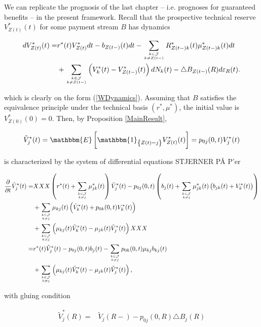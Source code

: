\documentclass{book}
\newcommand{\1}[1]{\mathbbm{1}_{\left\lbrace #1 \right\rbrace}}
\newcommand{\expec}[1][def]{\mathbbm{E} \left[ #1 \right]}
\theoremstyle{break}
\theoremstyle{remark}
\newenvironment{remark}
  {\pushQED{\qed}\renewcommand{\qedsymbol}{\scalebox{1.4}{$\circ$}}\remarkx}
  {\popQED\endremarkx}
\numberwithin{equation}{section}
\begin{document}
\begin{remark}
	We can replicate the prognosis of the last chapter -- i.e. prognoses for guaranteed benefits -- in the present framework. Recall that the prospective technical reserve $V_{Z(t)}^*(t)$ for some payment stream $B$ has dynamics
	
	\begin{align*}
			dV_{Z(t)}^*(t) =& r^*(t) V_{Z(t)}^* dt - b_{Z(t-)}(t) dt - \sum_{k \in \mathcal{J} \atop k \neq Z(t-)} R_{Z(t-)k}^*(t) \mu_{Z(t-)k}^*(t) dt \\
			&+ \sum_{k \in \mathcal{J} \atop k \neq Z(t-)} \left( V_k^*(t) - V_{Z(t-)}^*(t) \right) dN_k(t) - \triangle B_{Z(t-)}(R) d\varepsilon_{R}(t).
	\end{align*}

	which is clearly on the form (\ref{WDynamics}). Assuming that $B$ satisfies the equivalence principle under the technical basis $(r^*,\mu^*)$, the initial value is $V_{Z(0)}^*(0)=0$. Then, by Proposition \ref{MainResult},
	
	\begin{align*}
	\tilde{V}_j^*(t) = \expec[\1{Z(t)=j} V_{Z(t)}^*(t)] = p_{0j}(0,t) V_j^*(t)
	\end{align*}

	is characterized by the system of differential equations STJERNER PÅ P'er
	
	\begin{align*}
		\frac{\partial}{\partial t} \tilde{V}_j^*(t) =& XXX\left( r^*(t) + \sum_{k \in \mathcal{J} \atop k \neq j} \mu_{jk}^*(t) \right) \tilde{V}_j^*(t) - p_{0j}(0,t) \left( b_j(t) + \sum_{k \in \mathcal{J} \atop k \neq j} \mu_{jk}^*(t) \left( b_{jk}(t) + V_k^*(t) \right) \right) \\
		&+ \sum_{k \in \mathcal{J} \atop k \neq j} \mu_{kj}(t) \left( \tilde{V}_k^*(t) + p_{0k}(0,t) V_k^*(t) \right) \\
		&+ \sum_{k \in \mathcal{J} \atop k \neq j} \left( \mu_{kj}(t) \tilde{V}_k^*(t) - \mu_{jk}(t) \tilde{V}_j^*(t) \right)XXX \\
		=& r^*(t) \tilde{V}_j^*(t) - p_{0j}(0,t) b_j(t) - \sum_{k \in \mathcal{J} \atop k \neq j} p_{0k}(0,t) \mu_{kj} b_{kj}(t) \\
		&+ \sum_{k \in \mathcal{J} \atop k \neq j} \left( \mu_{kj}(t) \tilde{V}_k^*(t) - \mu_{jk}(t) \tilde{V}_j^*(t) \right),
	\end{align*}

	with gluing condition
	
	\begin{align*}
	\tilde{V}_j^*(R) =& \tilde{V}_j(R-) - p_{0j}(0,R) \triangle B_j(R)
	\end{align*}


\end{remark}
\end{document}
